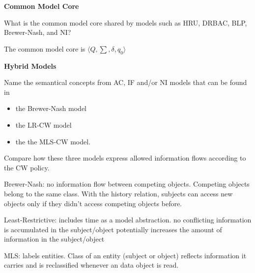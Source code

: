 \documentclass[10pt]{exam}  %
\begin{document}
\begin{questions}
    \begin{solution}
    \end{solution}

    \question \textbf{Common Model Core}\hfill

    What is the common model core shared by models such as HRU, DRBAC, BLP, Brewer-Nash, and NI?
    \begin{solution}
        The common model core is $\langle Q, \sum, \delta, q_0\rangle$
    \end{solution}

    \question \textbf{Hybrid Models}\hfill

    Name the semantical concepts from AC, IF and/or NI models that can be found in
    \begin{itemize}
        \item the Brewer-Nash model
        \item the LR-CW model
        \item the the MLS-CW model.
    \end{itemize}
    Compare how these three models express allowed information flows according to the CW policy.
    \begin{solution}
        Brewer-Nash: no information flow between competing objects. Competing objects belong to the same class. With the history relation, subjects can access new objects only if they didn't access competing objects before.

        Least-Restrictive: includes time as a model abstraction. no conflicting information is accumulated in the subject/object potentially increases the amount of information in the subject/object

        MLS: labels entities. Class of an entity (subject or object) reflects information it carries and is reclassified whenever an data object is read.
    \end{solution}

\end{questions}
\end{document}
